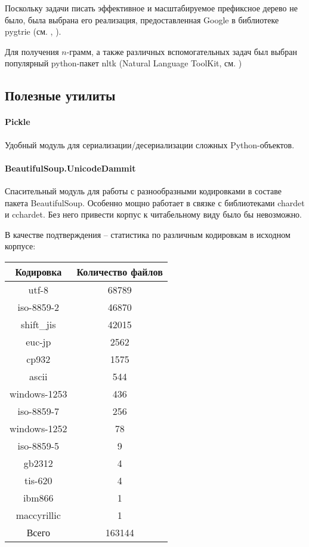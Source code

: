 Поскольку задачи писать эффективное и масштабируемое префиксное дерево не было, была выбрана его реализация, предоставленная Google в библиотеке pygtrie (см. \cite{python:pygtrie}, \cite{python:pygtrierepo}). 

Для получения $n$-грамм, а также различных вспомогательных задач был выбран популярный python-пакет nltk (Natural Language ToolKit, см. \cite{python:nltk})

\subsection{ Полезные утилиты }

\paragraph{ Pickle } Удобный модуль для сериализации/десериализации сложных Python-объектов.

\paragraph{ BeautifulSoup.UnicodeDammit } Спасительный модуль для работы с разнообразными кодировками в составе пакета BeautifulSoup. Особенно мощно работает в связке с библиотеками chardet и cchardet. Без него привести корпус к читабельному виду было бы невозможно.

В качестве подтверждения -- статистика по различным кодировкам в исходном корпусе:

\begin{tabular}{c|c}
Кодировка & Количество файлов \\ \hline 
utf-8 & 68789\\ 
iso-8859-2 & 46870\\ 
shift\_jis & 42015\\ 
euc-jp & 2562\\ 
cp932 & 1575\\ 
ascii & 544\\ 
windows-1253 & 436\\ 
iso-8859-7 & 256\\ 
windows-1252 & 78\\ 
iso-8859-5 & 9\\ 
gb2312 & 4\\ 
tis-620 & 4\\ 
ibm866 & 1\\ 
maccyrillic & 1\\ \hline
Всего & 163144
\end{tabular}

